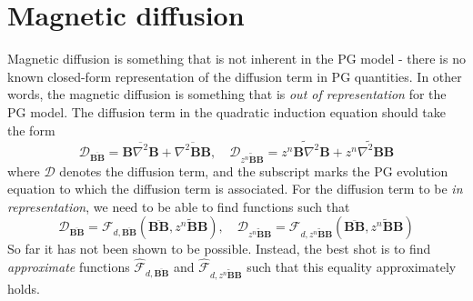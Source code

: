 \section{Magnetic diffusion}

Magnetic diffusion is something that is not inherent in the PG model - there is no known closed-form representation of the diffusion term in PG quantities. In other words, the magnetic diffusion is something that is \textit{out of representation} for the PG model. The diffusion term in the quadratic induction equation should take the form
\begin{equation}
    \mathscr{D}_{\overline{\mathbf{B}\mathbf{B}}} = \overline{\mathbf{B} \nabla^2 \mathbf{B}} + \overline{\nabla^2 \mathbf{B} \mathbf{B}},\quad 
    \mathscr{D}_{\widetilde{z^n\mathbf{B}\mathbf{B}}} = \widetilde{z^n \mathbf{B} \nabla^2 \mathbf{B}} + \widetilde{z^n \nabla^2 \mathbf{B} \mathbf{B}}
\end{equation}
where $\mathscr{D}$ denotes the diffusion term, and the subscript marks the PG evolution equation to which the diffusion term is associated. For the diffusion term to be \textit{in representation}, we need to be able to find functions such that
\[
    \mathscr{D}_{\overline{\mathbf{B}\mathbf{B}}} = \mathcal{F}_{d,\overline{\mathbf{B}\mathbf{B}}} \left(\overline{\mathbf{B}\mathbf{B}}, \widetilde{z^n\mathbf{B}\mathbf{B}}\right),\quad 
    \mathscr{D}_{\widetilde{z^n\mathbf{B}\mathbf{B}}} = \mathcal{F}_{d,\widetilde{z^n\mathbf{B}\mathbf{B}}} \left(\overline{\mathbf{B}\mathbf{B}}, \widetilde{z^n\mathbf{B}\mathbf{B}}\right)
\]
So far it has not been shown to be possible. Instead, the best shot is to find \textit{approximate} functions $\hat{\mathcal{F}}_{d,\overline{\mathbf{B}\mathbf{B}}}$ and $\hat{\mathcal{F}}_{d,\widetilde{z^n\mathbf{B}\mathbf{B}}}$ such that this equality approximately holds.

